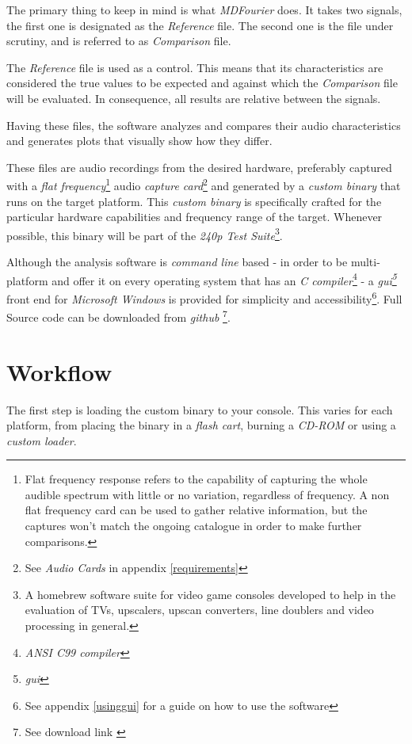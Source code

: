 \documentclass[10pt,a4paper]{report}
\newcommand{\define}[1]{\textit{\acrshort{#1}\footnote{\textit{\acrlong{#1}}}}}
\begin{document}
The primary thing to keep in mind is what \textit{MDFourier} does. It takes two signals, the first one is designated as the \textit{Reference} file. The second one is the file under scrutiny, and is referred to as \textit{Comparison} file. 

The \textit{Reference} file is used as a control. This means that its characteristics are considered the true values to be expected and against which the \textit{Comparison} file will be evaluated. In consequence, all results are relative between the signals.

Having these files, the software analyzes and compares their audio characteristics and generates plots that visually show how they differ.

These files are audio recordings from the desired hardware, preferably captured with a \textit{flat frequency}\footnote{Flat frequency response refers to the capability of capturing the whole audible spectrum with little or no variation, regardless of frequency. A non flat frequency card can be used to gather relative information, but the captures won't match the ongoing catalogue in order to make further comparisons.} audio \textit{capture card}\footnote{See \textit{Audio Cards} in appendix \ref{requirements}} and generated by a \textit{custom binary} that runs on the target platform. This \textit{custom binary} is specifically crafted for the particular hardware capabilities and frequency range of the target. Whenever possible, this binary will be part of the \textit{240p Test Suite}\footnote{A homebrew software suite for video game consoles developed to help in the evaluation of TVs, upscalers, upscan converters, line doublers and video processing in general.\cite{240pSuite}}. 


Although the analysis software is \textit{command line} based - in order to be multi-platform and offer it on every operating system that has an \textit{C compiler}\footnote{\textit{ANSI C99 compiler}} - a \define{gui} front end for \textit{Microsoft Windows} is provided for simplicity and accessibility\footnote{See appendix \ref{usinggui} for a guide on how to use the software}. Full Source code can be downloaded from \textit{github} \footnote{See download link \cite{sourcecode}}.

\section{Workflow}
\label{workflow}

The first step is loading the custom binary to your console. This varies for each platform, from placing the binary in a \textit{flash cart}, burning a \textit{CD-ROM} or using a \textit{custom loader}.
\end{document}
